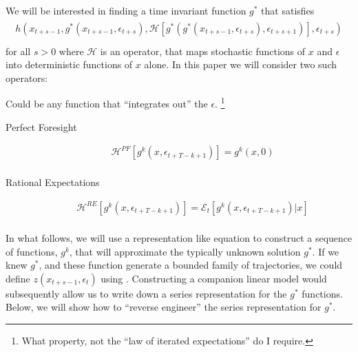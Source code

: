 \documentclass[12pt]{article}
\begin{document}
We will be interested in
finding a time invariant function $g^\ast$ that satisfies
\begin{gather}
  \begin{split}
h(x_{t+s-1},g^\ast(x_{t+s-1},\epsilon_{t+s}),\mathcal{H}[g^\ast(g^\ast(x_{t+s-1},\epsilon_{t+s}),\epsilon_{t+s+1})],\epsilon_{t+s}) \label{theProblem} \\
  \end{split}
 \end{gather}
 for all $s>0$ where $\mathcal{H}$ is an operator, 
  that maps stochastic functions of $x$ and $\epsilon$ into deterministic 
functions of $x$ alone.  In this paper we will consider two such operators:



Could be any function that ``integrates out'' the $\epsilon$.
\footnote{What property, not the ``law of iterated expectations'' do I require.}


\begin{description}
\item[Perfect Foresight]
\begin{gather}
     \mathcal{H}^{PF}[g^{k}(x,\epsilon_{t+T-k+1})]=
g^{k}(x,0)\\
\end{gather}


\item[Rational Expectations] 
\begin{gather}
     \mathcal{H}^{RE}[g^{k}(x,\epsilon_{t+T-k+1})]=
\mathcal{E}_t[g^{k}(x,\epsilon_{t+T-k+1})|x]\\
\end{gather}

 \end{description}












In what follows, we will use a representation like equation  
to construct a sequence of functions, $g^k$, 
that will approximate the typically unknown solution $g^\ast$.
If we knew $g^\ast$, and  these function generate a bounded family of 
trajectories, we could define $z(x_{t+s-1},\epsilon_t)$ using .
Constructing a companion linear model would subsequently allow 
 us to write down a series representation for the $g^\ast$ functions.  Below, we will show how to ``reverse engineer'' the series representation for $g^\ast$.
\end{document}
